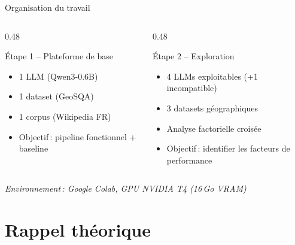 \documentclass[aspectratio=169, 12pt]{beamer}
\begin{document}
\begin{frame}{Organisation du travail}
  \begin{columns}[T]
    \begin{column}{0.48\textwidth}
      \begin{block}{\'Etape 1 -- Plateforme de base}
        \begin{itemize}
          \item 1 LLM (Qwen3-0.6B)
          \item 1 dataset (GeoSQA)
          \item 1 corpus (Wikipedia FR)
          \item Objectif\,: pipeline fonctionnel + baseline
        \end{itemize}
      \end{block}
    \end{column}
    \begin{column}{0.48\textwidth}
      \begin{block}{\'Etape 2 -- Exploration}
        \begin{itemize}
          \item 4 LLMs exploitables (+1 incompatible)
          \item 3 datasets g\'eographiques
          \item Analyse factorielle crois\'ee
          \item Objectif\,: identifier les facteurs de performance
        \end{itemize}
      \end{block}
    \end{column}
  \end{columns}

  \vspace{0.4cm}
  \centering
  \small
  \textit{Environnement\,: Google Colab, GPU NVIDIA T4 (16\,Go VRAM)}
\end{frame}

\section{Rappel th\'eorique}
\end{document}
